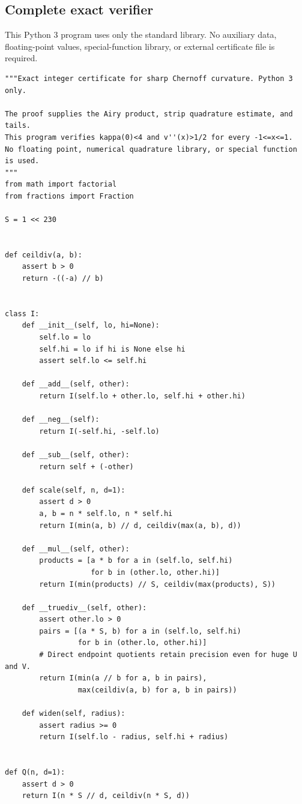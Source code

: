 \documentclass[11pt,a4paper]{article}
\numberwithin{equation}{section}
\theoremstyle{definition}
\theoremstyle{remark}
\begin{document}
\subsection{Complete exact verifier}
This Python 3 program uses only the standard library. No auxiliary data,
floating-point values, special-function library, or external certificate
file is required.

\begin{Verbatim}
"""Exact integer certificate for sharp Chernoff curvature. Python 3 only.

The proof supplies the Airy product, strip quadrature estimate, and tails.
This program verifies kappa(0)<4 and v''(x)>1/2 for every -1<=x<=1.
No floating point, numerical quadrature library, or special function is used.
"""
from math import factorial
from fractions import Fraction

S = 1 << 230


def ceildiv(a, b):
    assert b > 0
    return -((-a) // b)


class I:
    def __init__(self, lo, hi=None):
        self.lo = lo
        self.hi = lo if hi is None else hi
        assert self.lo <= self.hi

    def __add__(self, other):
        return I(self.lo + other.lo, self.hi + other.hi)

    def __neg__(self):
        return I(-self.hi, -self.lo)

    def __sub__(self, other):
        return self + (-other)

    def scale(self, n, d=1):
        assert d > 0
        a, b = n * self.lo, n * self.hi
        return I(min(a, b) // d, ceildiv(max(a, b), d))

    def __mul__(self, other):
        products = [a * b for a in (self.lo, self.hi)
                    for b in (other.lo, other.hi)]
        return I(min(products) // S, ceildiv(max(products), S))

    def __truediv__(self, other):
        assert other.lo > 0
        pairs = [(a * S, b) for a in (self.lo, self.hi)
                 for b in (other.lo, other.hi)]
        # Direct endpoint quotients retain precision even for huge U and V.
        return I(min(a // b for a, b in pairs),
                 max(ceildiv(a, b) for a, b in pairs))

    def widen(self, radius):
        assert radius >= 0
        return I(self.lo - radius, self.hi + radius)


def Q(n, d=1):
    assert d > 0
    return I(n * S // d, ceildiv(n * S, d))



\end{Verbatim}
\end{document}

